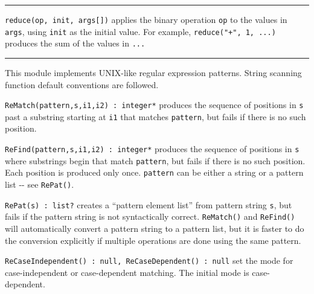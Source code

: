 \vspace{0.25cm}\hrule{}

\texttt{reduce(op, init, args[])} applies the binary
operation \texttt{op} to the values in \texttt{args}, using
\texttt{init} as the initial value. For example,
\texttt{reduce("+", 1, ...)} produces
the sum of the values in \texttt{...}

\vspace{0.25cm}\hrule{}

This module implements UNIX-like regular
expression patterns. %
String scanning function default conventions are followed.

\texttt{ReMatch(pattern,s,i1,i2) : integer*} produces the sequence of
positions in \texttt{s} past a substring starting at \texttt{i1} that
matches \texttt{pattern}, but fails if there is no such position.

\texttt{ReFind(pattern,s,i1,i2) : integer*} produces the sequence of
positions in \texttt{s} where substrings begin that match
\texttt{pattern}, but fails if there is no such position.
Each position is produced only once. %
\texttt{pattern} can be
either a string or a pattern list -{}- see \texttt{RePat()}.

\texttt{RePat(s) : list?} creates a ``pattern element list'' from pattern
string \texttt{s}, but fails if the pattern string is not syntactically
correct. \texttt{ReMatch()} and \texttt{ReFind()} will automatically
convert a pattern string to a pattern list, but it is faster to do the
conversion explicitly if multiple operations are done using the same
pattern. %

\texttt{ReCaseIndependent() : null, ReCaseDependent() : null} set the
mode for case-independent or case-dependent matching. The initial mode
is case-dependent.

